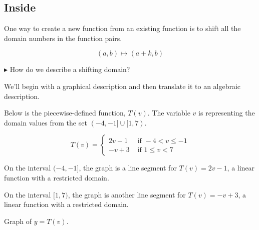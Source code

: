 \documentclass{ximera}
\begin{document}
\subsection*{Inside}



One way to create a new function from an existing function is to shift all the domain numbers in the function pairs. 

\[
(a, b) \mapsto (a + k, b)
\]



\textbf{\textcolor{blue!55!black}{$\blacktriangleright$}} How do we describe a shifting domain? 

We'll begin with a graphical description and then translate it to an algebraic description. 




Below is the piecewise-defined function, $T(v)$.  The variable $v$ is representing the domain values from the set $(-4,-1] \cup [1,7)$.




\[
T(v) = 
\begin{cases}
  2v-1 & \text{ if }  -4 < v \leq -1 \\
  -v+3 & \text{ if } 1 \leq v < 7
\end{cases}
\]


On the interval $(-4, -1]$, the graph is a line segment for $T(v) = 2v-1$, a linear function with a restricted domain. 



On the interval $[1, 7)$, the graph is another line segment for $T(v) = -v+3$, a linear function with a restricted domain. 




Graph of $y = T(v)$.
\begin{image}
\end{image}
\end{document}

